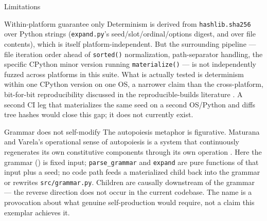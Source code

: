 \documentclass[
  ignorenonframetext,
]{beamer}
\begin{document}
\begin{frame}{Limitations}
\begin{block}{Within-platform guarantee only}
\protect{}\label{within-platform-guarantee-only}
Determinism is derived from \texttt{hashlib.sha256} over Python strings
(\texttt{expand.py}'s seed/slot/ordinal/options digest, and
 over file
contents), which is itself platform-independent. But the surrounding
pipeline --- file iteration order ahead of \texttt{sorted()}
normalization, path-separator handling, the specific CPython minor
version running \texttt{materialize()} --- is not independently fuzzed
across platforms in this suite. What is actually tested is determinism
within one CPython version on one OS, a narrower claim than the
cross-platform, bit-for-bit reproducibility discussed in the
reproducible-builds literature . A second CI
leg that materializes the same seed on a second OS/Python and diffs tree
hashes would close this gap; it does not currently exist.
\end{block}

\begin{block}{Grammar does not self-modify}
\protect{}\label{grammar-does-not-self-modify}
The autopoiesis metaphor is figurative. Maturana and Varela's
operational sense of autopoiesis is a system that continuously
regenerates its own constitutive components through its own operation
. Here the grammar
() is fixed input;
\texttt{parse\_grammar} and \texttt{expand} are pure functions of that
input plus a seed; no code path feeds a materialized child back into the
grammar or rewrites \texttt{src/grammar.py}. Children are causally
downstream of the grammar --- the reverse direction does not occur in
the current codebase. The name is a provocation about what genuine
self-production would require, not a claim this exemplar achieves it.
\end{block}


\end{frame}
\end{document}
